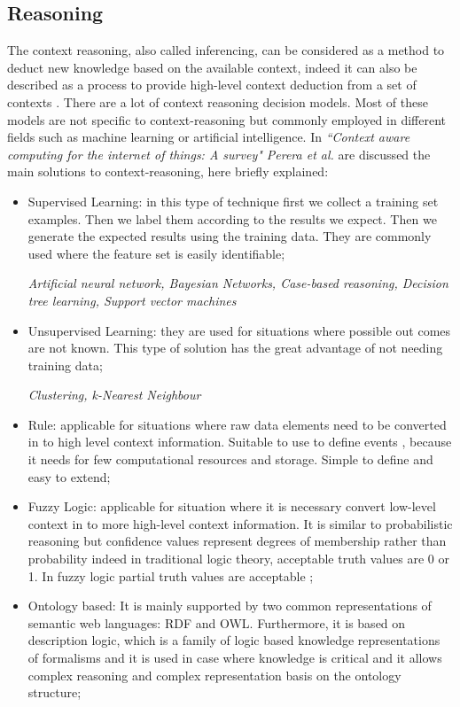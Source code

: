 \documentclass{thesisreport}
\begin{document}
 \subsection{Reasoning}
 The context reasoning, also called inferencing, can be considered as a method to deduct new knowledge based on the available context, indeed it can also be described as a process to provide high-level context deduction from a set of contexts \cite{perera2014context}.
 There are a lot of context reasoning decision models. Most of these models are not specific to context-reasoning but commonly employed in different fields such as machine learning or artificial intelligence.
 In \textit{``Context aware computing for the internet of things: A survey" Perera et al.} \cite{perera2014context} are discussed the main solutions to context-reasoning, here briefly explained: 
 \begin{itemize}
     \item Supervised Learning: in this type of technique first we collect a training set examples. Then we label them according to the results we expect. Then we generate the expected results using the training data.
     They are commonly used where the feature set is easily identifiable;
     
     \textit{Artificial neural network, Bayesian Networks, Case-based reasoning, Decision tree learning, Support vector machines}
     \item Unsupervised Learning: they are used for situations where possible out comes are not known. This type of solution has the great advantage of not needing training data;
     
     \textit{Clustering, k-Nearest Neighbour}
     \item Rule: applicable for situations where raw data elements need to be converted in to high level context information. Suitable to use to define events , because it needs for few computational resources and storage. Simple to define and easy to extend; 
     \item Fuzzy Logic: applicable for situation where it is necessary convert low-level context in to more high-level context information. It is similar to probabilistic reasoning but confidence values represent degrees of membership rather than probability indeed in traditional logic theory, acceptable truth values are 0 or 1. In fuzzy logic partial truth values are acceptable \cite{perera2014context}; 
     \item Ontology based: It is mainly supported by two common representations of semantic web languages: RDF and OWL. Furthermore, it is based on description logic, which is a family of logic based knowledge representations of formalisms and it is used in case where knowledge is critical and it allows complex reasoning and complex representation basis on the ontology structure;
    

\end{itemize}
\end{document}
